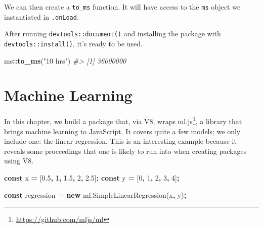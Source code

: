 \documentclass[10pt,]{krantz}
\makeatletter
\newenvironment{Shaded}{\begin{snugshade}}{\end{snugshade}}
\newcommand{\AttributeTok}[1]{\textcolor[rgb]{0.61,0.61,0.61}{#1}}
\newcommand{\CommentTok}[1]{\textcolor[rgb]{0.37,0.37,0.37}{\textit{#1}}}
\newcommand{\ControlFlowTok}[1]{\textcolor[rgb]{0.27,0.27,0.27}{\textbf{#1}}}
\newcommand{\DecValTok}[1]{\textcolor[rgb]{0.06,0.06,0.06}{#1}}
\newcommand{\FloatTok}[1]{\textcolor[rgb]{0.06,0.06,0.06}{#1}}
\newcommand{\KeywordTok}[1]{\textcolor[rgb]{0.27,0.27,0.27}{\textbf{#1}}}
\newcommand{\NormalTok}[1]{#1}
\newcommand{\OperatorTok}[1]{\textcolor[rgb]{0.43,0.43,0.43}{\textbf{#1}}}
\newcommand{\StringTok}[1]{\textcolor[rgb]{0.5,0.5,0.5}{#1}}
\newcommand{\VariableTok}[1]{\textcolor[rgb]{0,0,0}{#1}}
\renewcommand{\href}[2]{#2\footnote{\url{#1}}}
\newenvironment{kframe}{%
\medskip{}
\setlength{\fboxsep}{.8em}
 \def\at@end@of@kframe{}%
 \ifinner\ifhmode%
  \def\at@end@of@kframe{\end{minipage}}%
  \begin{minipage}{\columnwidth}%
 \fi\fi%
 \def\FrameCommand##1{\hskip\@totalleftmargin \hskip-\fboxsep
 \colorbox{shadecolor}{##1}\hskip-\fboxsep
     \hskip-\linewidth \hskip-\@totalleftmargin \hskip\columnwidth}%
 \MakeFramed {\advance\hsize-\width
   \@totalleftmargin\z@ \linewidth\hsize
   \@setminipage}}%
 {\par\unskip\endMakeFramed%
 \at@end@of@kframe}
\renewenvironment{Shaded}{\begin{kframe}}{\end{kframe}}
\makeatother
\begin{document}
We can then create a \texttt{to\_ms} function. It will have access to the \texttt{ms} object we instantiated in \texttt{.onLoad}.

\begin{Shaded}
\end{Shaded}

After running \texttt{devtools::document()} and installing the package with \texttt{devtools::install()}, it's ready to be used.

\begin{Shaded}
\begin{Highlighting}[]
\NormalTok{ms}\OperatorTok{::}\KeywordTok{to_ms}\NormalTok{(}\StringTok{"10 hrs"}\NormalTok{)}
\CommentTok{#> [1] 36000000}
\end{Highlighting}
\end{Shaded}

\hypertarget{v8-ml}{%
\chapter{Machine Learning}\label{v8-ml}}

In this chapter, we build a package that, via V8, wraps \href{https://github.com/mljs/ml}{ml.js}, a library that brings machine learning to JavaScript. It covers quite a few models; we only include one: the linear regression. This is an interesting example because it reveals some proceedings that one is likely to run into when creating packages using V8.

\begin{Shaded}
\begin{Highlighting}[]
\KeywordTok{const}\NormalTok{ x }\OperatorTok{=}\NormalTok{ [}\FloatTok{0.5}\OperatorTok{,} \DecValTok{1}\OperatorTok{,} \FloatTok{1.5}\OperatorTok{,} \DecValTok{2}\OperatorTok{,} \FloatTok{2.5}\NormalTok{]}\OperatorTok{;}
\KeywordTok{const}\NormalTok{ y }\OperatorTok{=}\NormalTok{ [}\DecValTok{0}\OperatorTok{,} \DecValTok{1}\OperatorTok{,} \DecValTok{2}\OperatorTok{,} \DecValTok{3}\OperatorTok{,} \DecValTok{4}\NormalTok{]}\OperatorTok{;}

\KeywordTok{const}\NormalTok{ regression }\OperatorTok{=} \KeywordTok{new} \VariableTok{ml}\NormalTok{.}\AttributeTok{SimpleLinearRegression}\NormalTok{(x}\OperatorTok{,}\NormalTok{ y)}\OperatorTok{;}
\end{Highlighting}
\end{Shaded}
\end{document}
